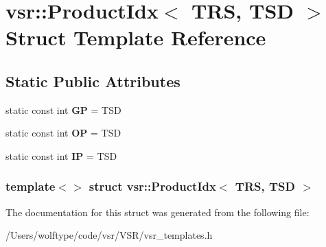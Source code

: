 \hypertarget{structvsr_1_1_product_idx_3_01_t_r_s_00_01_t_s_d_01_4}{\section{vsr\-:\-:Product\-Idx$<$ T\-R\-S, T\-S\-D $>$ Struct Template Reference}
\label{structvsr_1_1_product_idx_3_01_t_r_s_00_01_t_s_d_01_4}
}
\subsection*{Static Public Attributes}
\begin{DoxyCompactItemize}
\item 
\hypertarget{structvsr_1_1_product_idx_3_01_t_r_s_00_01_t_s_d_01_4_a2f862324b6f1cd5543c10edb7b72956e}{static const int {\bfseries G\-P} = T\-S\-D}\label{structvsr_1_1_product_idx_3_01_t_r_s_00_01_t_s_d_01_4_a2f862324b6f1cd5543c10edb7b72956e}

\item 
\hypertarget{structvsr_1_1_product_idx_3_01_t_r_s_00_01_t_s_d_01_4_ab48cf7acad83f1846968540c160ebff4}{static const int {\bfseries O\-P} = T\-S\-D}\label{structvsr_1_1_product_idx_3_01_t_r_s_00_01_t_s_d_01_4_ab48cf7acad83f1846968540c160ebff4}

\item 
\hypertarget{structvsr_1_1_product_idx_3_01_t_r_s_00_01_t_s_d_01_4_a33cd56478a635279f172024025f71c25}{static const int {\bfseries I\-P} = T\-S\-D}\label{structvsr_1_1_product_idx_3_01_t_r_s_00_01_t_s_d_01_4_a33cd56478a635279f172024025f71c25}

\end{DoxyCompactItemize}
\subsubsection*{template$<$$>$ struct vsr\-::\-Product\-Idx$<$ T\-R\-S, T\-S\-D $>$}



The documentation for this struct was generated from the following file\-:\begin{DoxyCompactItemize}
\item 
/\-Users/wolftype/code/vsr/\-V\-S\-R/vsr\-\_\-templates.\-h\end{DoxyCompactItemize}

